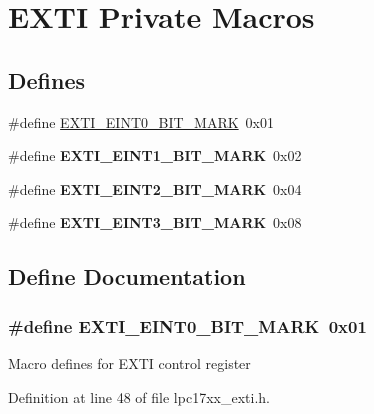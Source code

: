 \hypertarget{group___e_x_t_i___private___macros}{\section{\-E\-X\-T\-I \-Private \-Macros}
\label{group___e_x_t_i___private___macros}
}
\subsection*{\-Defines}
\begin{DoxyCompactItemize}
\item 
\#define \hyperlink{group___e_x_t_i___private___macros_ga82e0184c92596efa67680c68294225d6}{\-E\-X\-T\-I\-\_\-\-E\-I\-N\-T0\-\_\-\-B\-I\-T\-\_\-\-M\-A\-R\-K}~0x01
\item 
\hypertarget{group___e_x_t_i___private___macros_ga9a6f4f8931ba2098ca8c79c51644b722}{\#define {\bfseries \-E\-X\-T\-I\-\_\-\-E\-I\-N\-T1\-\_\-\-B\-I\-T\-\_\-\-M\-A\-R\-K}~0x02}\label{group___e_x_t_i___private___macros_ga9a6f4f8931ba2098ca8c79c51644b722}

\item 
\hypertarget{group___e_x_t_i___private___macros_gad536433adbc2d53209a1a2781f9329ba}{\#define {\bfseries \-E\-X\-T\-I\-\_\-\-E\-I\-N\-T2\-\_\-\-B\-I\-T\-\_\-\-M\-A\-R\-K}~0x04}\label{group___e_x_t_i___private___macros_gad536433adbc2d53209a1a2781f9329ba}

\item 
\hypertarget{group___e_x_t_i___private___macros_ga19a24232ad8c1e16fa438bbc34ff5724}{\#define {\bfseries \-E\-X\-T\-I\-\_\-\-E\-I\-N\-T3\-\_\-\-B\-I\-T\-\_\-\-M\-A\-R\-K}~0x08}\label{group___e_x_t_i___private___macros_ga19a24232ad8c1e16fa438bbc34ff5724}

\end{DoxyCompactItemize}


\subsection{\-Define \-Documentation}
\hypertarget{group___e_x_t_i___private___macros_ga82e0184c92596efa67680c68294225d6}{
\subsubsection[{\-E\-X\-T\-I\-\_\-\-E\-I\-N\-T0\-\_\-\-B\-I\-T\-\_\-\-M\-A\-R\-K}]{\setlength{\rightskip}{0pt plus 5cm}\#define {\bf \-E\-X\-T\-I\-\_\-\-E\-I\-N\-T0\-\_\-\-B\-I\-T\-\_\-\-M\-A\-R\-K}~0x01}}\label{group___e_x_t_i___private___macros_ga82e0184c92596efa67680c68294225d6}
\-Macro defines for \-E\-X\-T\-I control register 

\-Definition at line 48 of file lpc17xx\-\_\-exti.\-h.

